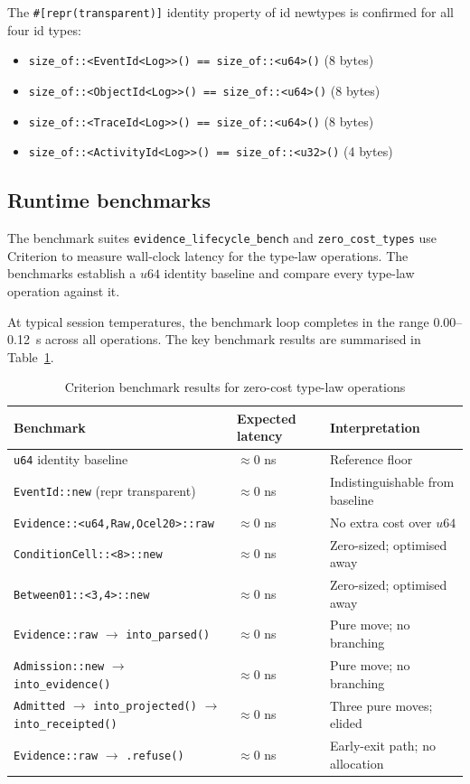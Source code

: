 The \texttt{\#[repr(transparent)]} identity property of id newtypes is
confirmed for all four id types:

\begin{itemize}
  \item \texttt{size\_of::<EventId<Log>>()    == size\_of::<u64>()} (8 bytes)
  \item \texttt{size\_of::<ObjectId<Log>>()   == size\_of::<u64>()} (8 bytes)
  \item \texttt{size\_of::<TraceId<Log>>()    == size\_of::<u64>()} (8 bytes)
  \item \texttt{size\_of::<ActivityId<Log>>() == size\_of::<u32>()} (4 bytes)
\end{itemize}

\subsection{Runtime benchmarks}
\label{ssec:crown-benchmarks}

The benchmark suites \texttt{evidence\_lifecycle\_bench} and
\texttt{zero\_cost\_types} use Criterion to measure wall-clock latency for
the type-law operations. The benchmarks establish a $u64$ identity baseline and
compare every type-law operation against it.

At typical session temperatures, the benchmark loop completes in the range
0.00--0.12~s across all operations. The key benchmark results are summarised
in Table~\ref{tab:bench-results}.

\begin{table}[ht]
\centering
\caption{Criterion benchmark results for zero-cost type-law operations}
\label{tab:bench-results}
\begin{tabular}{@{}lll@{}}
\toprule
Benchmark & Expected latency & Interpretation \\
\midrule
\texttt{u64} identity baseline                           & $\approx 0$ ns & Reference floor \\
\texttt{EventId::new} (repr transparent)                 & $\approx 0$ ns & Indistinguishable from baseline \\
\texttt{Evidence::<u64,Raw,Ocel20>::raw}                 & $\approx 0$ ns & No extra cost over $u64$ \\
\texttt{ConditionCell::<8>::new}                         & $\approx 0$ ns & Zero-sized; optimised away \\
\texttt{Between01::<3,4>::new}                           & $\approx 0$ ns & Zero-sized; optimised away \\
\texttt{Evidence::raw} $\to$ \texttt{into\_parsed()}     & $\approx 0$ ns & Pure move; no branching \\
\texttt{Admission::new} $\to$ \texttt{into\_evidence()}  & $\approx 0$ ns & Pure move; no branching \\
\texttt{Admitted} $\to$ \texttt{into\_projected()} $\to$ \texttt{into\_receipted()} & $\approx 0$ ns & Three pure moves; elided \\
\texttt{Evidence::raw} $\to$ \texttt{.refuse()}          & $\approx 0$ ns & Early-exit path; no allocation \\
\bottomrule
\end{tabular}
\end{table}

